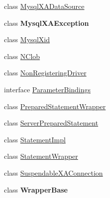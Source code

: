 \begin{DoxyCompactItemize}
\item 
class \mbox{\hyperlink{classcom_1_1mysql_1_1cj_1_1jdbc_1_1_mysql_x_a_data_source}{Mysql\+X\+A\+Data\+Source}}
\item 
class {\bfseries Mysql\+X\+A\+Exception}
\item 
class \mbox{\hyperlink{classcom_1_1mysql_1_1cj_1_1jdbc_1_1_mysql_xid}{Mysql\+Xid}}
\item 
class \mbox{\hyperlink{classcom_1_1mysql_1_1cj_1_1jdbc_1_1_n_clob}{N\+Clob}}
\item 
class \mbox{\hyperlink{classcom_1_1mysql_1_1cj_1_1jdbc_1_1_non_registering_driver}{Non\+Registering\+Driver}}
\item 
interface \mbox{\hyperlink{interfacecom_1_1mysql_1_1cj_1_1jdbc_1_1_parameter_bindings}{Parameter\+Bindings}}
\item 
class \mbox{\hyperlink{classcom_1_1mysql_1_1cj_1_1jdbc_1_1_prepared_statement_wrapper}{Prepared\+Statement\+Wrapper}}
\item 
class \mbox{\hyperlink{classcom_1_1mysql_1_1cj_1_1jdbc_1_1_server_prepared_statement}{Server\+Prepared\+Statement}}
\item 
class \mbox{\hyperlink{classcom_1_1mysql_1_1cj_1_1jdbc_1_1_statement_impl}{Statement\+Impl}}
\item 
class \mbox{\hyperlink{classcom_1_1mysql_1_1cj_1_1jdbc_1_1_statement_wrapper}{Statement\+Wrapper}}
\item 
class \mbox{\hyperlink{classcom_1_1mysql_1_1cj_1_1jdbc_1_1_suspendable_x_a_connection}{Suspendable\+X\+A\+Connection}}
\item 
class {\bfseries Wrapper\+Base}
\end{DoxyCompactItemize}
